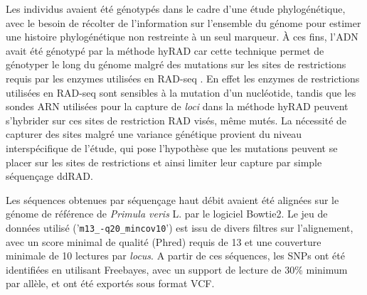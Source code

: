 \documentclass[../Master_report2.tex]{subfiles}
\begin{document}
Les individus avaient été génotypés dans le cadre d'une étude phylogénétique, avec le besoin de récolter de l'information sur l'ensemble du génome pour estimer une histoire phylogénétique non restreinte à un seul marqueur. À ces fins, l'ADN avait été génotypé par la méthode hyRAD \citep{Suchan2016} car cette technique permet de génotyper le long du génome malgré des mutations sur les sites de restrictions requis par les enzymes utilisées en RAD-seq \citep{Davey2010}. En effet les enzymes de restrictions utilisées en RAD-seq sont sensibles à la mutation d'un nucléotide, tandis que les sondes ARN utilisées pour la capture de \textit{loci} dans la méthode hyRAD peuvent s'hybrider sur ces sites de restriction RAD visés, même mutés. La nécessité de capturer des sites malgré une variance génétique provient du niveau interspécifique de l'étude, qui pose l'hypothèse que les mutations peuvent se placer sur les sites de restrictions et ainsi limiter leur capture par simple séquençage ddRAD. 

Les séquences obtenues par séquençage haut débit avaient été alignées sur le génome de référence de \textit{Primula veris} L. par le logiciel Bowtie2. Le jeu de données utilisé ('\verb|m13_-q20_mincov10|') est issu de divers filtres sur l'alignement, avec un score minimal de qualité (Phred) requis de 13 et une couverture minimale de 10 lectures par \textit{locus}. A partir de ces séquences, les SNPs ont été identifiées en utilisant Freebayes, avec un support de lecture de 30\% minimum par allèle, et ont été exportés sous format VCF.
\end{document}
